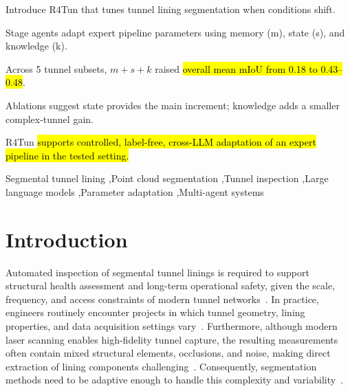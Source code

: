 \documentclass[a4paper,fleqn]{cas-dc}
\begin{document}
{%

\begin{highlights}
\item Introduce R4Tun that tunes tunnel lining segmentation when conditions shift.
\item Stage agents adapt expert pipeline parameters using memory (m), state (s), and knowledge (k).
\item Across 5 tunnel subsets, \mbox{$m+s+k$} raised \hl{overall mean mIoU from 0.18 to 0.43--0.48}.
\item Ablations suggest state provides the main increment; knowledge adds a smaller complex-tunnel gain.
\item R4Tun \hl{supports controlled, label-free, cross-LLM adaptation of an expert pipeline in the tested setting.}
\end
{highlights}


\begin{keywords}
Segmental tunnel lining \sep Point cloud segmentation \sep Tunnel inspection \sep Large language models \sep Parameter adaptation \sep Multi-agent systems
\end{keywords}
\date{\today}

\maketitle

\smallskip

\section{Introduction}\label{sec:intro}

Automated inspection of segmental tunnel linings is required to support structural health assessment and long-term operational safety, given the scale, frequency, and access constraints of modern tunnel networks~\cite{attard2018}. In practice, engineers routinely encounter projects in which tunnel geometry, lining properties, and data acquisition settings vary~\cite{weidner2024generalized}. Furthermore, although modern laser scanning enables high-fidelity tunnel capture, the resulting measurements often contain mixed structural elements, occlusions, and noise, making direct extraction of lining components challenging~\cite{huang2021bim,sjolander2023towards}. Consequently, segmentation methods need to be adaptive enough to handle this complexity and variability~\cite{montero2015, strauss2020sensing}.

}
\end{document}
